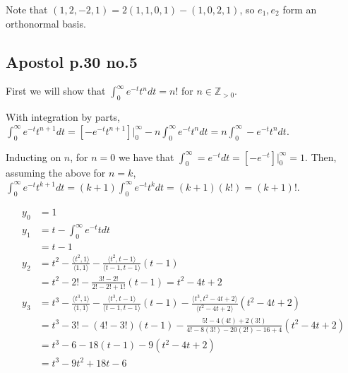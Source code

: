 \documentclass[12pt,letterpaper]{article}
\theoremstyle{definition}
\newcommand{\Zg}{\mathbb{Z}_{>0}}
\begin{document}
Note that $(1, 2, -2 ,1) = 2(1, 1, 0, 1) - (1, 0, 2, 1)$, so $e_1, e_2$ form an
orthonormal basis.

\subsection*{Apostol p.30 no.5}

First we will show that $\int_0^\infty e^{-t}t^ndt = n!$ for $n \in \Zg$.

With integration by parts, $\int_0^\infty e^{-t}t^{n+1}dt =
[-e^{-t}t^{n+1}]\Big|_0^\infty - n\int_0^\infty e^{-t}t^ndt = n\int_0^\infty
-e^{-t}t^ndt$.

Inducting on $n$, for $n = 0$ we have that $\int_0^\infty = e^{-t}dt =
[-e^{-t}]\Big|_0^\infty = 1$. Then, assuming the above for $n = k$,
$\int_0^\infty e^{-t}t^{k+1}dt = (k+1)\int_0^\infty e^{-t}t^{k}dt = (k+1)(k!) = (k+1)!$.

\begin{align*}
  y_0 &= 1 \\
  y_1 &= t - \int_0^\infty e^{-t}tdt \\
      &= t - 1 \\
  y_2 &= t^2 - \frac{\langle t^2, 1 \rangle}{\langle 1,1 \rangle} - \frac{\langle t^2, t-1 \rangle}{\langle t-1,t-1 \rangle}(t-1) \\
      &= t^2 - 2! - \frac{3! - 2!}{2! - 2! + 1!}(t-1) = t^2 -4t +  2 \\
  y_3 &= t^3 - \frac{\langle t^3, 1 \rangle}{\langle 1,1 \rangle} - \frac{\langle t^3, t-1 \rangle}{\langle t-1,t-1 \rangle}(t-1) - \frac{\langle t^3, t^2 - 4t + 2 \rangle}{\langle t^2 - 4t + 2 \rangle}(t^2 - 4t + 2) \\
      &= t^3 - 3! - (4! - 3!)(t-1) - \frac{5! - 4(4!)+2(3!)}{4! - 8(3!) - 20(2!) - 16 + 4}(t^2 - 4t + 2) \\
      &= t^3 - 6 - 18(t-1)  - 9(t^2 - 4t + 2) \\
      &= t^3 - 9t^2 + 18t - 6
\end{align*}
\end{document}
